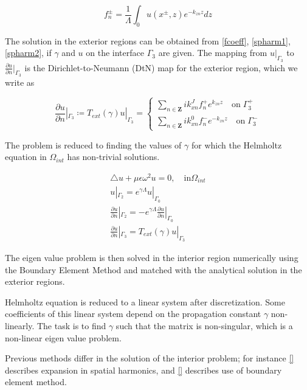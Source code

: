 \begin{equation}
f_n^\pm = \frac{1}{\Lambda}\int_0 u(x^\pm,z) e^{-k_{zn} z} dz
\label{fcoeff}
\end{equation}

The solution in the exterior regions can be obtained from
\ref{fcoeff}, \ref{spharm1}, \ref{spharm2}, if $\gamma$ and $u$ on the
interface $\Gamma_3$ are given. The mapping from $u|_{\Gamma_3}$ to
$\frac{\partial u}{\partial n} |_{\Gamma_3}$ is the
Dirichlet-to-Neumann (DtN) map for the exterior region, which we write
as

\begin{equation}
\frac{\partial u}{\partial n} |_{\Gamma_3} \coloneqq T_{ext}(\gamma)
u|_{\Gamma_3} = \left \{ \begin{array}{ll} \sum_{n \in \mathbf{Z}} i
k_{xn}^J f_n^+ e^{k_{zn}z} \quad \textrm{on} \; \Gamma_3^+ \\
\sum_{n \in \mathbf{Z}} ik_{xn}^0 f_n^- e^{-k_{zn}z} \quad
\textrm{on}\; \Gamma_3^- \end{array}\right .
\end{equation}

The problem is reduced to finding the values of $\gamma$ for which the
Helmholtz equation in $\Omega_{int}$ has non-trivial solutions.

\begin{equation}
\begin{array}{ll}
\triangle u + \mu \epsilon \omega^2 u = 0, \quad \textrm{in}
\Omega_{int} \\
u|_{\Gamma_2} = e^{\gamma \Lambda} u|_{\Gamma_0} \\
\frac{\partial u}{\partial n} |_{\Gamma_2} = -e^{\gamma \Lambda}
 \frac{\partial u}{\partial n} |_{\Gamma_0} \\
\frac{\partial u}{\partial n} |_{\Gamma_3} =  T_{ext}(\gamma) u|_{\Gamma_3}
\end{array}
\end{equation} 

 The eigen value problem is then solved in the interior region
numerically using the Boundary Element Method and matched with the
analytical solution in the exterior regions.

Helmholtz equation is reduced to a linear system after
discretization. Some coefficients of this linear system depend on the
propagation constant $\gamma$ non-linearly. The task is to find
$\gamma$ such that the matrix is non-singular, which is a non-linear
eigen value problem.

Previous methods differ in the solution of the interior problem; for
instance \ref{} describes expansion in spatial harmonics, and \ref{}
describes use of boundary element method.

